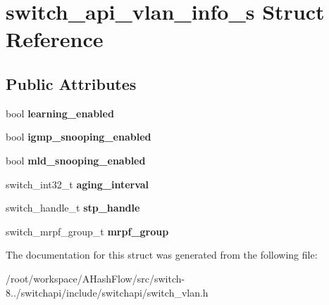 \hypertarget{structswitch__api__vlan__info__s}{\section{switch\+\_\+api\+\_\+vlan\+\_\+info\+\_\+s Struct Reference}
\label{structswitch__api__vlan__info__s}
}
\subsection*{Public Attributes}
\begin{DoxyCompactItemize}
\item 
\hypertarget{structswitch__api__vlan__info__s_a6683d948504b8963ab0aa971e045100c}{bool {\bfseries learning\+\_\+enabled}}\label{structswitch__api__vlan__info__s_a6683d948504b8963ab0aa971e045100c}

\item 
\hypertarget{structswitch__api__vlan__info__s_a6529e13f7615ecce0c803777d8f62baa}{bool {\bfseries igmp\+\_\+snooping\+\_\+enabled}}\label{structswitch__api__vlan__info__s_a6529e13f7615ecce0c803777d8f62baa}

\item 
\hypertarget{structswitch__api__vlan__info__s_a59c7a471ba8ca3f0015b22bcc76b9db2}{bool {\bfseries mld\+\_\+snooping\+\_\+enabled}}\label{structswitch__api__vlan__info__s_a59c7a471ba8ca3f0015b22bcc76b9db2}

\item 
\hypertarget{structswitch__api__vlan__info__s_ab4c22cbf8173f173e00177704ab1723a}{switch\+\_\+int32\+\_\+t {\bfseries aging\+\_\+interval}}\label{structswitch__api__vlan__info__s_ab4c22cbf8173f173e00177704ab1723a}

\item 
\hypertarget{structswitch__api__vlan__info__s_ab117f696fb7ea023fb9a3c74dbe16431}{switch\+\_\+handle\+\_\+t {\bfseries stp\+\_\+handle}}\label{structswitch__api__vlan__info__s_ab117f696fb7ea023fb9a3c74dbe16431}

\item 
\hypertarget{structswitch__api__vlan__info__s_a23365de9ab7146a7921f959e6c163332}{switch\+\_\+mrpf\+\_\+group\+\_\+t {\bfseries mrpf\+\_\+group}}\label{structswitch__api__vlan__info__s_a23365de9ab7146a7921f959e6c163332}

\end{DoxyCompactItemize}


The documentation for this struct was generated from the following file\+:\begin{DoxyCompactItemize}
\item 
/root/workspace/\+A\+Hash\+Flow/src/switch-\/8../switchapi/include/switchapi/switch\+\_\+vlan.\+h\end{DoxyCompactItemize}

